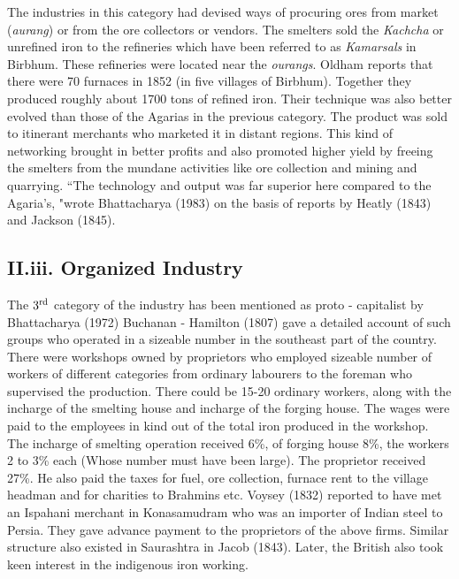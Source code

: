 The industries in this category had devised ways of procuring ores from market ({\it aurang}) or from the ore collectors or vendors.  The smelters sold the {\it Kachcha} or unrefined iron to the refineries which have been referred to as {\it Kamarsals} in Birbhum.  These refineries were located near the {\it ourangs}.  Oldham reports that there were 70 furnaces in 1852 (in five villages of Birbhum).  Together they produced roughly about 1700 tons of refined iron.  Their technique was also better evolved than those of the Agarias in the previous category.  The product was sold to itinerant merchants who marketed it in distant regions. This kind of networking brought in better profits and also promoted higher yield by freeing the smelters from the mundane activities like ore collection and mining and quarrying. ``The technology and output was far superior here compared to the Agaria's, "wrote Bhattacharya (1983) on the basis of reports by Heatly (1843) and Jackson (1845).  

\vspace{-.3cm}

\subsection*{II.iii. Organized Industry}\label{subsection-3}

\vspace{-.2cm}

The $3^{\rm rd}$ category of the industry has been mentioned as proto - capitalist by Bhattacharya (1972) Buchanan - Hamilton (1807) gave a detailed account of such groups who operated in a sizeable number in the southeast part of the country.  There were workshops owned by proprietors who employed sizeable number of workers of different categories from ordinary labourers to the foreman who supervised the production. There could be 15-20 ordinary workers, along with the incharge of the smelting house and incharge of the forging house.  The wages were paid to the employees in kind out of the total iron produced in the workshop.  The incharge of smelting operation received 6\%, of forging house 8\%, the workers 2 to 3\% each (Whose number must have been large).  The proprietor received 27\%.  He also paid the taxes for fuel, ore collection, furnace rent to the village headman and for charities to Brahmins etc. Voysey (1832) reported to have met an Ispahani merchant in Konasamudram who was an importer of Indian steel to Persia.  They gave advance payment to the proprietors of the above firms.  Similar structure also existed in Saurashtra in Jacob (1843). Later, the British also took keen interest in the indigenous iron working.  

